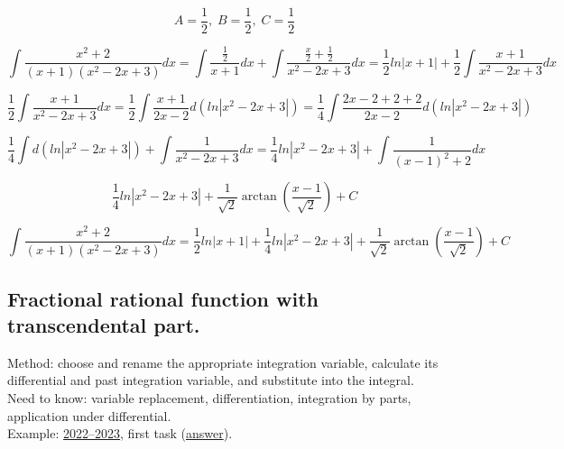 \documentclass{article}
\begin{document}
\begin{equation}
    A = \frac{1}{2}, \; B = \frac{1}{2}, \; C = \frac{1}{2}
\end{equation}

\begin{equation*}
    \int \frac{x^2+2}{(x+1)(x^2-2x+3)}dx = \int \frac{\frac{1}{2}}{x+1}dx + \int \frac{\frac{x}{2}+\frac{1}{2}}{x^2-2x+3}dx = \frac{1}{2}ln|x+1| + \frac{1}{2} \int \frac{x+1}{x^2-2x+3}dx
\end{equation*}

\begin{equation*}
    \frac{1}{2} \int \frac{x+1}{x^2-2x+3}dx = \frac{1}{2} \int \frac{x+1}{2x-2}d(ln|x^2-2x+3|) = \frac{1}{4} \int \frac{2x-2+2+2}{2x-2}d(ln|x^2-2x+3|)
\end{equation*}

\begin{equation*}
    \frac{1}{4} \int d(ln|x^2-2x+3|) + \int \frac{1}{x^2-2x+3}dx = \frac{1}{4} ln|x^2-2x+3| + \int \frac{1}{(x-1)^2+2}dx
\end{equation*}

\begin{equation*}
    \frac{1}{4} ln|x^2-2x+3| + \frac{1}{\sqrt{2}} \arctan (\frac{x-1}{\sqrt{2}}) + C
\end{equation*}

\begin{equation}
    \int \frac{x^2+2}{(x+1)(x^2-2x+3)}dx = \frac{1}{2}ln|x+1| + \frac{1}{4} ln|x^2-2x+3| + \frac{1}{\sqrt{2}} \arctan (\frac{x-1}{\sqrt{2}}) + C
\end{equation}

\subsection{Fractional rational function with transcendental part.}

Method: choose and rename the appropriate integration variable, calculate its differential and past integration variable, and substitute into the integral. \\
Need to know: variable replacement, differentiation, integration by parts, application under differential. \\
Example: \href{https://old.mipt.ru/education/chair/mathematics/exams/exams/2022-23/%D0%9C%D0%90%D0%98%D0%B8%D0%A0_%D0%92_23.pdf}{2022–2023}, first task (\href{https://old.mipt.ru/education/chair/mathematics/exams/exams/2022-23/%D0%9C%D0%90%D0%98%D0%B8%D0%A0_%D0%92_23%D0%BE%D1%82%D0%B2%D0%B5%D1%82%D1%8B.pdf}{answer}).
\end{document}
